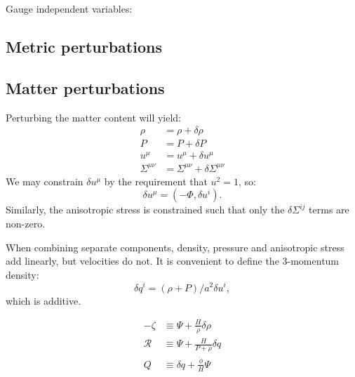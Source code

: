 Gauge independent variables:

\subsection{Metric perturbations}

\subsection{Matter perturbations}
Perturbing the matter content will yield:
\begin{align}
  \rho &= \rho + \delta\rho 
  \label{eqn:cos:rho_perturb}\\
  P &= P + \delta P 
  \label{eqn:cos:P_perturb}\\
  u^\mu &= u^\mu + \delta u^\mu 
  \label{eqn:cos:u_perturb}\\
  \Sigma^{\mu\nu} &= \Sigma^{\mu\nu}+ \delta\Sigma^{\mu\nu}
  \label{eqn:cos:sigma_perturb}
\end{align}
We may constrain $\delta u^\mu$ by the requirement that $u^2=1$, so:
\begin{equation}
  \delta u^\mu = (-\Phi,\delta u^i).
\end{equation}
Similarly, the anisotropic stress is constrained such that only the $\delta\Sigma^{ij}$ terms are non-zero.

When combining separate components, density, pressure and anisotropic stress add linearly, but velocities do not. It is convenient to define the 3-momentum density:
\begin{equation}
  \delta q^i = (\rho+P)/a^2 \delta u^i,
\end{equation}
which is additive.



\begin{align}
  -\zeta &\equiv \Psi + \frac{H}{\dot{\rho}}\delta\rho
  \label{eqn:cos:gauge_zeta}\\
  \mathcal{R} &\equiv \Psi + \frac{H}{P+\rho}\delta q
  \label{eqn:cos:gauge_R}\\
  Q &\equiv \delta q + \frac{\dot{\phi}}{H}\Psi
  \label{eqn:cos:gauge_Q}\\
\end{align}

